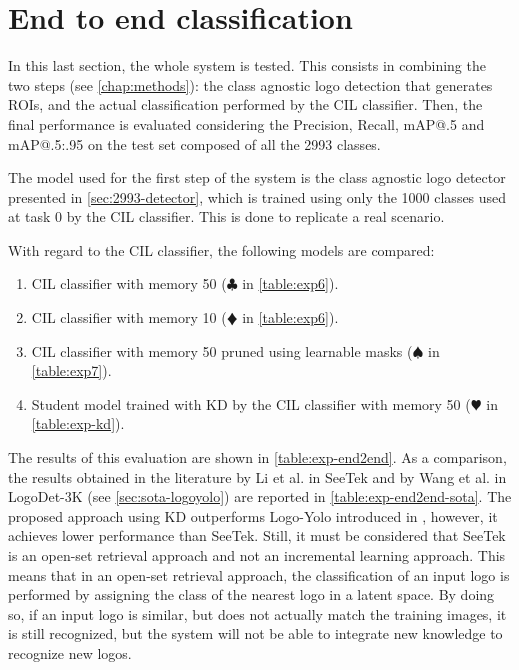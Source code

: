 \section{End to end classification}
\label{sec:exp-end2end}

In this last section, the whole system is tested.
This consists in combining the two steps (see \autoref{chap:methods}): the class agnostic logo detection that generates ROIs, and the actual classification performed by the CIL classifier.
Then, the final performance is evaluated considering the Precision, Recall, mAP@.5 and mAP@.5:.95 on the test set composed of all the 2993 classes.

The model used for the first step of the system is the class agnostic logo detector presented in \autoref{sec:2993-detector}, which is trained using only the 1000 classes used at task 0 by the CIL classifier.
This is done to replicate a real scenario.

With regard to the CIL classifier, the following models are compared:
\begin{enumerate}
    \item CIL classifier with memory 50 ($\clubsuit$ in \autoref{table:exp6}).
    \item CIL classifier with memory 10 ($\vardiamondsuit$ in \autoref{table:exp6}).
    \item CIL classifier with memory 50 pruned using learnable masks ($\spadesuit$ in \autoref{table:exp7}).
    \item Student model trained with KD by the CIL classifier with memory 50 ($\varheartsuit$ in \autoref{table:exp-kd}).
\end{enumerate}

The results of this evaluation are shown in \autoref{table:exp-end2end}. As a comparison, the results obtained in the literature by Li et al. in SeeTek \cite{li2022seetek} and by Wang et al. in LogoDet-3K \cite{wang2022logodet} (see \autoref{sec:sota-logoyolo}) are reported in \autoref{table:exp-end2end-sota}. The proposed approach using KD outperforms Logo-Yolo introduced in \cite{wang2022logodet}, however, it achieves lower performance than SeeTek. Still, it must be considered that SeeTek is an open-set retrieval approach and not an incremental learning approach. This means that in an open-set retrieval approach, the classification of an input logo is performed by assigning the class of the nearest logo in a latent space. By doing so, if an input logo is similar, but does not actually match the training images, it is still recognized, but the system will not be able to integrate new knowledge to recognize new logos.

